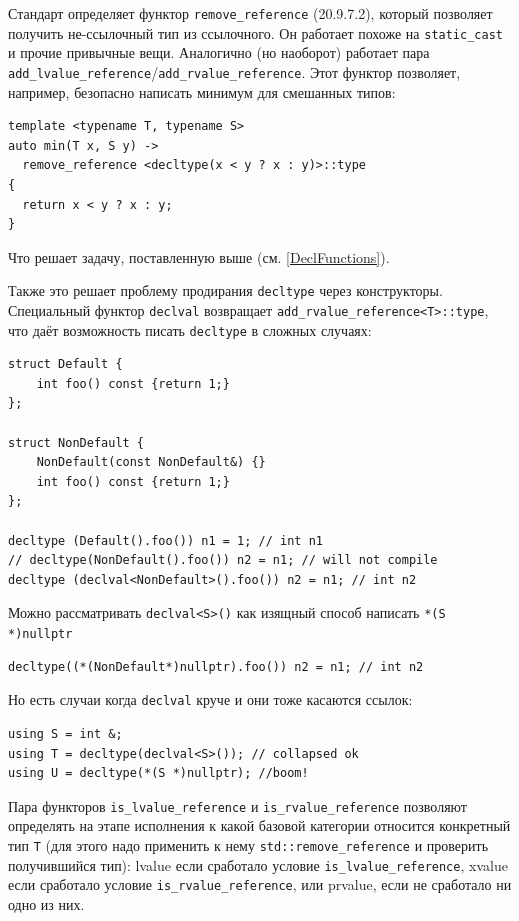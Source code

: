 \documentclass[a4paper,12pt,oneside]{article}
\begin{document}
Стандарт определяет функтор \lstinline!remove_reference! (20.9.7.2), который позволяет получить не-ссылочный тип из ссылочного. Он работает похоже на \lstinline!static_cast! и прочие привычные вещи. Аналогично (но наоборот) работает пара \lstinline!add_lvalue_reference!/\lstinline!add_rvalue_reference!. Этот функтор позволяет, например, безопасно написать минимум для смешанных типов:

\begin{lstlisting}
template <typename T, typename S>
auto min(T x, S y) -> 
  remove_reference <decltype(x < y ? x : y)>::type 
{
  return x < y ? x : y;
}
\end{lstlisting}

Что решает задачу, поставленную выше (см. \ref{DeclFunctions}).

Также это решает проблему продирания \lstinline!decltype! через конструкторы. Специальный функтор \lstinline!declval! возвращает \lstinline!add_rvalue_reference<T>::type!, что даёт возможность писать \lstinline!decltype! в сложных случаях:

\begin{lstlisting}
struct Default {
    int foo() const {return 1;}
};
 
struct NonDefault {
    NonDefault(const NonDefault&) {}
    int foo() const {return 1;}
};
 
decltype (Default().foo()) n1 = 1; // int n1
// decltype(NonDefault().foo()) n2 = n1; // will not compile
decltype (declval<NonDefault>().foo()) n2 = n1; // int n2
\end{lstlisting}

Можно рассматривать \lstinline!declval<S>()! как изящный способ написать \lstinline!*(S *)nullptr!

\begin{lstlisting}
decltype((*(NonDefault*)nullptr).foo()) n2 = n1; // int n2
\end{lstlisting}

Но есть случаи когда \lstinline!declval! круче и они тоже касаются ссылок:

\begin{lstlisting}
using S = int &;
using T = decltype(declval<S>()); // collapsed ok
using U = decltype(*(S *)nullptr); //boom!
\end{lstlisting}

Пара функторов \lstinline!is_lvalue_reference! и \lstinline!is_rvalue_reference! позволяют определять на этапе исполнения к какой базовой категории относится конкретный тип \lstinline!T! (для этого надо применить к нему \lstinline!std::remove_reference! и проверить получившийся тип): lvalue если сработало условие \lstinline!is_lvalue_reference!, xvalue если сработало условие \lstinline!is_rvalue_reference!, или prvalue, если не сработало ни одно из них.
\end{document}
